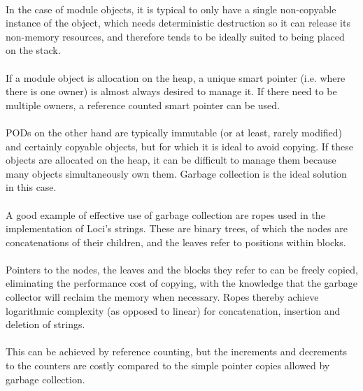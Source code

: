 \documentclass[12pt,twoside,notitlepage]{report}
\begin{document}
\paragraph{}
In the case of module objects, it is typical to only have a single non-copyable instance of the object, which needs deterministic destruction so it can release its non-memory resources, and therefore tends to be ideally suited to being placed on the stack.

\paragraph{}
If a module object is allocation on the heap, a unique smart pointer (i.e. where there is one owner) is almost always desired to manage it. If there need to be multiple owners, a reference counted smart pointer can be used.

\paragraph{}
PODs on the other hand are typically immutable (or at least, rarely modified) and certainly copyable objects, but for which it is ideal to avoid copying. If these objects are allocated on the heap, it can be difficult to manage them because many objects simultaneously own them. Garbage collection is the ideal solution in this case.

\paragraph{}
A good example of effective use of garbage collection are ropes used in the implementation of Loci's strings. These are binary trees, of which the nodes are concatenations of their children, and the leaves refer to positions within blocks.

\paragraph{}
Pointers to the nodes, the leaves and the blocks they refer to can be freely copied, eliminating the performance cost of copying, with the knowledge that the garbage collector will reclaim the memory when necessary. Ropes thereby achieve logarithmic complexity (as opposed to linear) for concatenation, insertion and deletion of strings.

\paragraph{}
This can be achieved by reference counting, but the increments and decrements to the counters are costly compared to the simple pointer copies allowed by garbage collection.
\end{document}
